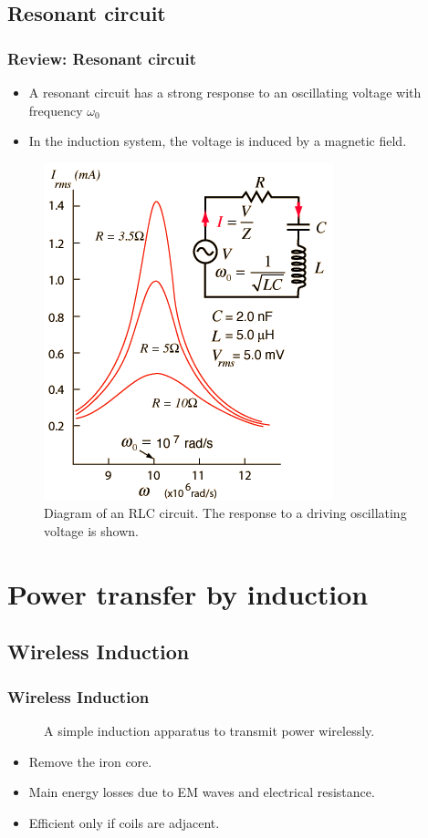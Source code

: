 \documentclass{beamer}
\begin{document}
\subsection{Resonant circuit}
\begin{frame}
  \frametitle{Review: Resonant circuit}
  \begin{itemize}
    \item A resonant circuit has a strong response to an oscillating voltage
      with frequency $\omega_0$
    \item In the induction system, the voltage is induced by a magnetic field.
  \end{itemize}
  \begin{figure}
  \includegraphics[scale=0.3]{images/RLC.png}
  \caption{Diagram of an RLC circuit.
    The response to a driving oscillating voltage is shown.
    \textcite{hyperphysicsresonate}}
  \end{figure}
\end{frame}


\section{Power transfer by induction}
\subsection{Wireless Induction}
\begin{frame}
  \frametitle{Wireless Induction}
  \begin{figure}
    
    \caption{A simple induction apparatus to transmit power wirelessly.}
  \end{figure}
  \begin{itemize}
    \item Remove the iron core.
    \item Main energy losses due to EM waves and electrical resistance.
    \item Efficient only if coils are adjacent.
  \end{itemize}
\end{frame}
\end{document}
